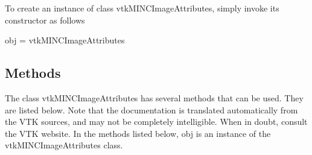 To create an instance of class vtk\-M\-I\-N\-C\-Image\-Attributes, simply invoke its constructor as follows \begin{DoxyVerb}  obj = vtkMINCImageAttributes
\end{DoxyVerb}
 \hypertarget{vtkwidgets_vtkxyplotwidget_Methods}{}\subsection{Methods}\label{vtkwidgets_vtkxyplotwidget_Methods}
The class vtk\-M\-I\-N\-C\-Image\-Attributes has several methods that can be used. They are listed below. Note that the documentation is translated automatically from the V\-T\-K sources, and may not be completely intelligible. When in doubt, consult the V\-T\-K website. In the methods listed below, {\ttfamily obj} is an instance of the vtk\-M\-I\-N\-C\-Image\-Attributes class. 
